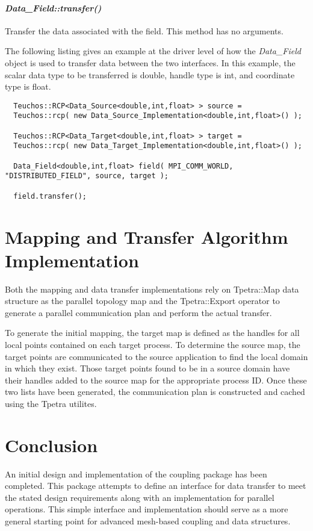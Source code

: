 \documentclass[letterpaper]{article}
\begin{document}
\paragraph{\sl Data\_Field::transfer()}
Transfer the data associated with the field. This method has no
arguments. 

The following listing gives an example at the driver level of how the
{\sl Data\_Field} object is used to transfer data between the two
interfaces. In this example, the scalar data type to be transferred is
double, handle type is int, and coordinate type is float.

\begin{lstlisting}
  Teuchos::RCP<Data_Source<double,int,float> > source = 
  Teuchos::rcp( new Data_Source_Implementation<double,int,float>() );

  Teuchos::RCP<Data_Target<double,int,float> > target = 
  Teuchos::rcp( new Data_Target_Implementation<double,int,float>() );

  Data_Field<double,int,float> field( MPI_COMM_WORLD, "DISTRIBUTED_FIELD", source, target ); 

  field.transfer();
\end{lstlisting}

\section{Mapping and Transfer Algorithm Implementation}

Both the mapping and data transfer implementations rely on Tpetra::Map
data structure as the parallel topology map and the Tpetra::Export
operator to generate a parallel communication plan and perform the
actual transfer.

To generate the initial mapping, the target map is defined as the handles
for all local points contained on each target process. To determine
the source map, the target points are communicated to the source
application to find the local domain in which they exist. Those
target points found to be in a source domain have their handles added to
the source map for the appropriate process ID. Once these two lists
have been generated, the communication plan is constructed and cached
using the Tpetra utilites.

\section{Conclusion}

An initial design and implementation of the coupling package has been
completed. This package attempts to define an interface for data
transfer to meet the stated design requirements along with an
implementation for parallel operations. This simple interface and
implementation should serve as a more general starting point for
advanced mesh-based coupling and data structures.
\end{document}
